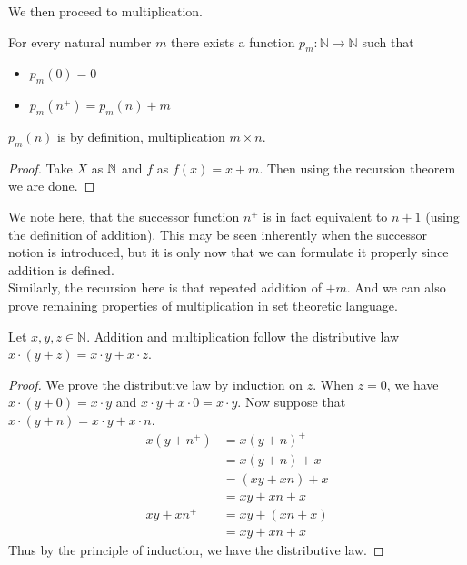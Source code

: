 \documentclass[a4paper]{article}
\begin{document}
We then proceed to multiplication. 

\begin{prp}{}{} For every natural number $m$ there exists a function $p_m:\mathbb{N}\to\mathbb{N}$ such that 
\begin{itemize}
\item $p_m(0)=0$
\item $p_m(n^+)=p_m(n)+m$
\end{itemize}
$p_m(n)$ is by definition, multiplication $m\times n$. 
\begin{proof}
Take $X$ as $\mathbb{N}$ and $f$ as $f(x)=x+m$. Then using the recursion theorem we are done. 
\end{proof}
\end{prp}

We note here, that the successor function $n^+$ is in fact equivalent to $n+1$ (using the definition of addition). This may be seen inherently when the successor notion is introduced, but it is only now that we can formulate it properly since addition is defined. \\
Similarly, the recursion here is that repeated addition of $+m$. And we can also prove remaining properties of multiplication in set theoretic language. 

\begin{prp}{}{} Let $x,y,z\in\mathbb{N}$. Addition and multiplication follow the distributive law $x\cdot(y+z)=x\cdot y+x\cdot z$. 
\begin{proof} We prove the distributive law by induction on $z$. When $z=0$, we have $x\cdot(y+0)=x\cdot y$ and $x\cdot y+x\cdot 0=x\cdot y$. Now suppose that $x\cdot(y+n)=x\cdot y+x\cdot n$. 
\begin{align*}
x(y+n^+)&=x(y+n)^+ \tag{Definition of Addition}\\
&=x(y+n)+x \tag{Definition of Multiplication}\\
&=(xy+xn)+x \tag{Induction Hypothesis}\\
&=xy+xn+x \tag{Associativity of Addition}\\
xy+xn^+&=xy+(xn+x) \tag{Definition of Multiplication}\\
&=xy+xn+x \tag{Associativity of Addition}
\end{align*}
Thus by the principle of induction, we have the distributive law. 
\end{proof}
\end{prp}
\end{document}
